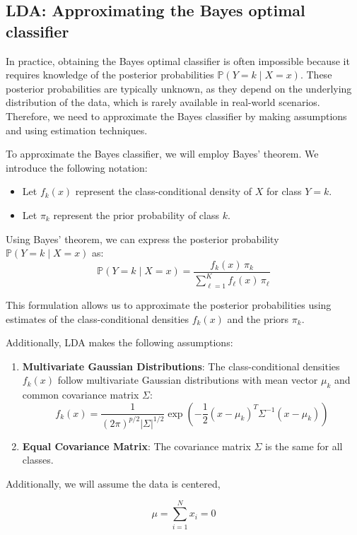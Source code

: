 \subsection{LDA: Approximating the Bayes optimal classifier}

In practice, obtaining the Bayes optimal classifier is often impossible because it requires knowledge of the posterior probabilities $\mathbb{P}(Y = k \mid X = x)$. These posterior probabilities are typically unknown, as they depend on the underlying distribution of the data, which is rarely available in real-world scenarios. Therefore, we need to approximate the Bayes classifier by making assumptions and using estimation techniques.

To approximate the Bayes classifier, we will employ Bayes' theorem. We introduce the following notation:
\begin{itemize}
    \item Let $f_k(x)$ represent the class-conditional density of $X$ for class $Y = k$.
    \item Let $\pi_k$ represent the prior probability of class $k$.
\end{itemize}

Using Bayes' theorem, we can express the posterior probability $\mathbb{P}(Y = k \mid X = x)$ as:
\[
\mathbb{P}(Y = k \mid X = x) = \frac{f_k(x) \, \pi_k}{\sum_{\ell=1}^K f_\ell(x) \, \pi_\ell}
\]

This formulation allows us to approximate the posterior probabilities using estimates of the class-conditional densities $f_k(x)$ and the priors $\pi_k$.

Additionally, LDA makes the following assumptions:

\begin{enumerate}
    \item \textbf{Multivariate Gaussian Distributions}: The class-conditional densities $f_k(x)$ follow multivariate Gaussian distributions with mean vector $\mu_k$ and common covariance matrix $\Sigma$:
    \[
    f_k(x) = \frac{1}{(2\pi)^{p/2} |\Sigma|^{1/2}} \exp\left(-\frac{1}{2}(x - \mu_k)^T \Sigma^{-1} (x - \mu_k)\right)
    \]
    \item \textbf{Equal Covariance Matrix}: The covariance matrix $\Sigma$ is the same for all classes.
\end{enumerate}

Additionally, we will assume the data is centered,

\[
\mu = \sum_{i=1}^N x_i = 0
\]

